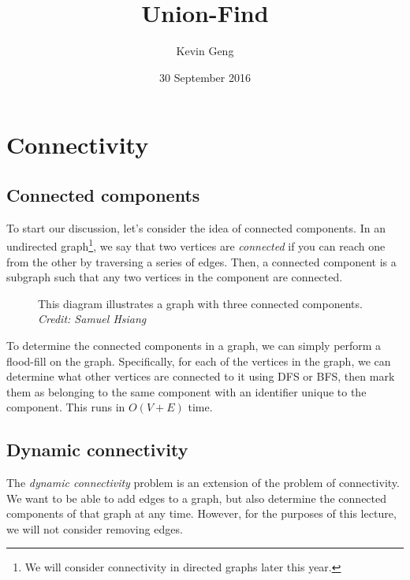 \documentclass{article}
\title{Union-Find}
\author{Kevin Geng}
\date{30 September 2016}
\begin{document}
\maketitle

\section{Connectivity}

\subsection{Connected components}

To start our discussion, let's consider the idea of connected components. In an undirected graph\footnote{We will consider connectivity in directed graphs later this year.}, we say that two vertices are \textit{connected} if you can reach one from the other by traversing a series of edges. Then, a connected component is a subgraph such that any two vertices in the component are connected.

\begin{figure}[h]
\centering
{}
\caption{This diagram illustrates a graph with three connected components. \textit{Credit: Samuel Hsiang}}
\end{figure}

To determine the connected components in a graph, we can simply perform a flood-fill on the graph. Specifically, for each of the vertices in the graph, we can determine what other vertices are connected to it using DFS or BFS, then mark them as belonging to the same component with an identifier unique to the component. This runs in $O(V+E)$ time.


\subsection{Dynamic connectivity}
The \textit{dynamic connectivity} problem is an extension of the problem of connectivity. We want to be able to add edges to a graph, but also determine the connected components of that graph at any time. However, for the purposes of this lecture, we will not consider removing edges.
\end{document}
